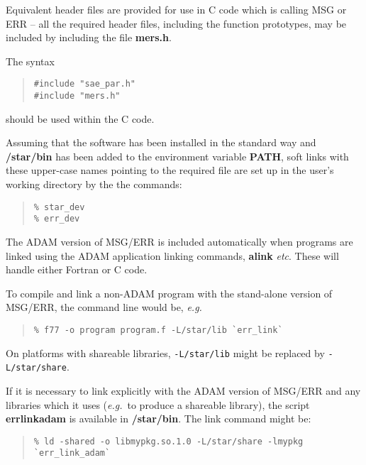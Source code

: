 \documentclass[twoside,11pt]{article}
\renewcommand{\_}{\texttt{\symbol{95}}}
\begin{document}
Equivalent header files are provided for use in C code which is calling MSG
or ERR -- all the required header files, including the function prototypes,
may be included by including the file \textbf{mers.h}.

The syntax
\begin{quote}
\begin{verbatim}
#include "sae_par.h"
#include "mers.h"
\end{verbatim}
\end{quote}
should be used within the C code.

Assuming that the software has been installed in the standard way and
\textbf{/star/bin} has been added to the environment variable
\textbf{PATH}, soft links with these upper-case names pointing to the required
file are set up in the user's working directory by the the commands:
\begin {quote}
\begin{small}
\begin{verbatim}
% star_dev
% err_dev
\end{verbatim}
\end{small}
\end {quote}

The ADAM version of MSG/ERR is included automatically when
programs are linked using the ADAM application linking commands, \textbf{alink}
\textit{etc}. These will handle either Fortran or C code.

To compile and link a non-ADAM program with the stand-alone version of
MSG/ERR, the command line would be, \textit{e.g.}
\begin {quote}
\begin{small}
\begin{verbatim}
% f77 -o program program.f -L/star/lib `err_link`
\end{verbatim}
\end{small}
\end {quote}

On platforms with shareable libraries, \texttt{-L/star/lib} might be replaced
by \texttt{-L/star/share}.

If it is necessary to link explicitly with the ADAM version of MSG/ERR and any
libraries which it uses (\textit{e.g.}\ to produce a shareable library), the
script \textbf{err\_link\_adam} is available in \textbf{/star/bin}.
The link command might be:
\begin {quote}
\begin {small}
\begin{verbatim}
% ld -shared -o libmypkg.so.1.0 -L/star/share -lmypkg `err_link_adam`
\end{verbatim}
\end {small}
\end {quote}
\end{document}
